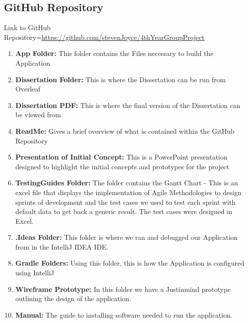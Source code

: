 \subsection{GitHub Repository}
Link to GitHub Repository={\url{https://github.com/stevenJoyce/4thYearGroupProject}}
\newline
\begin{enumerate}
    \item \textbf{App Folder:}
    \newline This folder contains the Files necessary to build the Application
    \item \textbf{Dissertation Folder:}
    \newline This is where the Dissertation can be run from Overleaf
    \item \textbf{Dissertation PDF:}
    \newline This is where the final version of the Dissertation can be viewed from
    \item \textbf{ReadMe:}
    \newline Gives a brief overview of what is contained within the GitHub Repository
    \item \textbf{Presentation of Initial Concept:}
    \newline This is a PowerPoint presentation designed to highlight the initial concepts and prototypes for the project
    \item \textbf{TestingGuides Folder:}
    \newline The folder contains the Gantt Chart -  This is an excel file that displays the implementation of Agile Methodologies to design sprints of development and the test cases we used to test each sprint with default data to get back a generic result. The test cases were designed in Excel.
    \item \textbf{.Ideas Folder:}
    \newline This folder is where we ran and debugged our Application from in the IntelliJ IDEA IDE.
    \item \textbf{Gradle Folders:}
    \newline Using this folder, this is how the Application is configured using IntelliJ
    \item \textbf{Wireframe Prototype:}
    \newline In this folder we have a Justinmind prototype outlining the design of the application.
    \item \textbf{Manual:}
    \newline The guide to installing software needed to run the application.
\end{enumerate}

